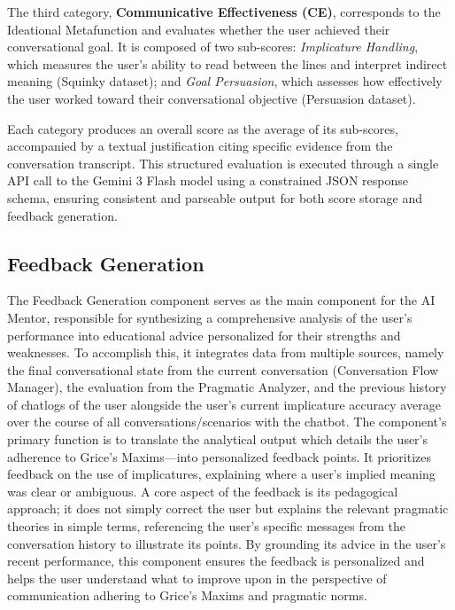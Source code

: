     The third category, \textbf{Communicative Effectiveness (CE)}, corresponds to the 
    Ideational Metafunction and evaluates whether the user achieved their conversational 
    goal. It is composed of two sub-scores: \textit{Implicature Handling}, which measures 
    the user's ability to read between the lines and interpret indirect meaning (Squinky 
    dataset); and \textit{Goal Persuasion}, which assesses how effectively the user worked 
    toward their conversational objective (Persuasion dataset).

    Each category produces an overall score as the average of its sub-scores, accompanied 
    by a textual justification citing specific evidence from the conversation transcript. 
    This structured evaluation is executed through a single API call to the Gemini 3 Flash 
    model using a constrained JSON response schema, ensuring consistent and parseable output 
    for both score storage and feedback generation.

    \subsection{Feedback Generation}

    The Feedback Generation component serves as the main component for the AI Mentor, responsible for synthesizing a comprehensive analysis of the user's performance into educational advice personalized for their strengths and weaknesses. To accomplish this, it integrates data from multiple sources, namely the final conversational state from the current conversation (Conversation Flow Manager), the evaluation from the Pragmatic Analyzer, and the previous history of chatlogs of the user alongside the user's current implicature accuracy average over the course of all conversations/scenarios with the chatbot. The component’s primary function is to translate the analytical output which details the user's adherence to Grice's Maxims—into personalized feedback points. It prioritizes feedback on the use of implicatures, explaining where a user's implied meaning was clear or ambiguous. A core aspect of the feedback is its pedagogical approach; it does not simply correct the user but explains the relevant pragmatic theories in simple terms, referencing the user's specific messages from the conversation history to illustrate its points. By grounding its advice in the user's recent performance, this component ensures the feedback is personalized and helps the user understand what to improve upon in the perspective of communication adhering to Grice's Maxims and pragmatic norms.

